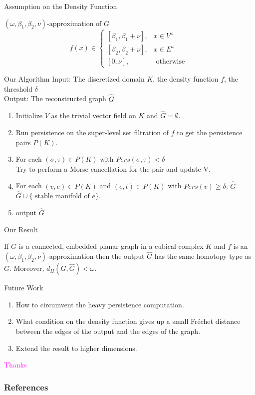 \documentclass[9pt,sans-serif]{beamer}
\begin{document}
\begin{frame}{Assumption on the Density Function}
  \begin{block}{$(\omega,\beta_1,\beta_2,\nu)$-approximation of $G$}
    \[
    f(x)\in
    \begin{cases}
      [\beta_1, \beta_1+\nu],&  x\in V^\omega \\
      [\beta_2, \beta_2+\nu],&  x\in E^\omega \\
      [0,\nu],& \text{ otherwise }
    \end{cases}
    \]
  \end{block}
\end{frame}

\begin{frame}{Our Algorithm}
  Input: The discretized domain $K$, the density function $f$, the threshold
  $\delta$ \\
  Output: The reconstructed graph $\hat G$
  \begin{enumerate}
  \item Initialize $V$ as the trivial vector field on $K$ and $\hat{G}=\emptyset$.
  \item Run persistence on the super-level set filtration of $f$ to get the
    persistence pairs $P(K)$.
  \item For each $(\sigma,\tau)\in P(K)$ with $Pers(\sigma,\tau)<\delta$ \\ Try
    to perform a Morse cancellation for the pair and update V.
  \item For each $(v,e)\in P(K)$ and $(e,t)\in P(K)$ with $Pers(v)\geq\delta$,
    $\hat G$ = $\hat G\cup\{\text{ stable manifold of } e\}$.
  \item   output $\hat G$
  \end{enumerate}    
\end{frame}

\begin{frame}{Our Result}

  \begin{theorem}{}
    If $G$ is a connected, embedded planar graph in a cubical complex $K$ and
    $f$ is an $(\omega,\beta_1,\beta_2,\nu)$-approximation then the output $\hat
    G$ has the same homotopy type as $G$. Moreover, $d_H(G,\hat G)<\omega$.
  \end{theorem}
\end{frame}

  
\begin{frame}{Future Work}
  
  \begin{enumerate}
  \item How to circumvent the heavy persistence computation.
    \pause
  \item What condition on the density function gives up a small Fr\'echet
    distance between the edges of the output and the edges of the graph.  \pause
  \item Extend the result to higher dimensions.
  \end{enumerate}
\end{frame}

\begin{frame}
  \centering
  \Huge{\textcolor{magenta}{Thanks}}
\end{frame}

\begin{frame}[allowframebreaks]
        \frametitle{References}
        
        
\end{frame}
\end{document}

